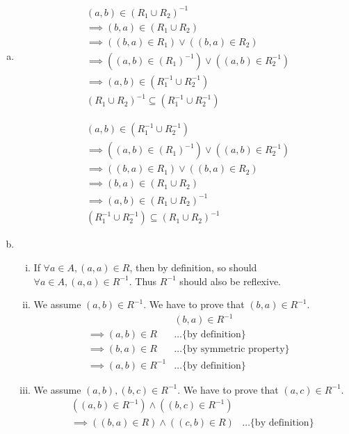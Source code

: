\documentclass[12pt]{scrartcl}
\begin{document}
\begin{enumerate}[a.]
\item \begin{align*}
    & (a,b) \in (R_1 \cup R_2)^{-1}
    \\& \implies (b,a) \in (R_1 \cup R_2)
    \\& \implies ((b,a) \in R_1) \lor ((b,a) \in R_2)
    \\& \implies ((a,b) \in (R_1)^{-1}) \lor  ((a,b) \in R_2^{-1})
    \\& \implies (a,b) \in (R_1^{-1} \cup R_2^{-1})
    \\& (R_1 \cup R_2)^{-1} \subseteq (R_1^{-1} \cup R_2^{-1})
\end{align*}

\begin{align*}
    & (a,b) \in (R_1^{-1} \cup R_2^{-1})
    \\& \implies ((a,b) \in (R_1)^{-1}) \lor  ((a,b) \in R_2^{-1})
    \\& \implies ((b,a) \in R_1) \lor ((b,a) \in R_2)
    \\& \implies (b,a) \in (R_1 \cup R_2)
    \\ & \implies (a,b) \in (R_1 \cup R_2)^{-1}    
     \\& (R_1^{-1} \cup R_2^{-1})   \subseteq  (R_1 \cup R_2)^{-1} 
\end{align*}
\item 
\begin{enumerate}[i.]
    \item If $\forall a \in A,(a,a) \in R$, then by definition, so should $\forall a \in A,(a,a) \in R^{-1}$. Thus $R^{-1}$ should also be reflexive.
    \item We assume $(a,b) \in R^{-1}$. We have to prove that $(b,a) \in R^{-1}$. 
    \begin{align*}
        & (b,a) \in R^{-1} &
        \\ \implies (a,b) \in R & \ldots \text{\{ by definition\}}
        \\ \implies (b,a) \in R & \ldots \text{\{ by symmetric property\}}
        \\ \implies (a,b) \in R^{-1} & \ldots \text{\{ by definition\}}
    \end{align*}
    \item We assume $(a,b), (b,c) \in R^{-1}$. We have to prove that $(a,c) \in R^{-1}$.
    \begin{align*}
         ((a,b) \in R^{-1}) \land ((b,c) \in R^{-1}) &
        \\ \implies ((b,a) \in R) \land ((c,b) \in R)  & \ldots \text{\{ by definition\}}

\end{align*}
\end{enumerate}
\end{enumerate}
\end{document}
